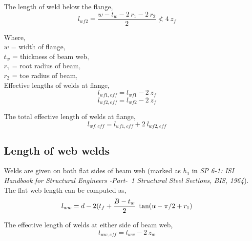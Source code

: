 \documentclass[11.5pt,a4paper,oneside]{report}
\begin{document}
\begin{Form}
The length of weld below the flange, 
\begin{equation}
	l_{wf2} = \frac{w- t_w - 2~r_1 - 2~r_2 }{2} \nless 4~z_f
\end{equation}

Where, \\
\indent $w$ = width of flange, \\
\indent $t_w$ = thickness of beam web, \\
\indent $r_1$ = root radius of beam, \\
\indent $r_2$ = toe radius of beam, \\

Effective lengths of welds at flange, \\
\begin{equation}
	l_{wf1,eff} = l_{wf1} - 2~z_f
\end{equation}
\begin{equation}
	l_{wf2,eff} = l_{wf2} - 2~z_f 
\end{equation}


The total effective length of welds at flange, \\

\begin{equation}
	l_{wf,eff} = l_{wf1,eff} + 2~l_{wf2,eff}
\end{equation}


\subsection{Length of web welds}
Welds are given on both flat sides of beam web (marked as $h_1$ in \textit{SP 6-1: ISI Handbook for Structural Engineers -Part-~1 Structural Steel Sections, BIS, 1964}). \\

The flat web length can be computed as, 
\begin{equation}
	l_{ww} = d- 2(t_f + \frac{B-t_w}{2}~\tan (\alpha-\pi/\small{2} + r_1)
\end{equation}

The effective length of welds at either side of beam web, \\

\begin{equation}
	l_{ww,eff} = l_{ww}-2~z_w
\end{equation}



\end{Form}
\end{document}
